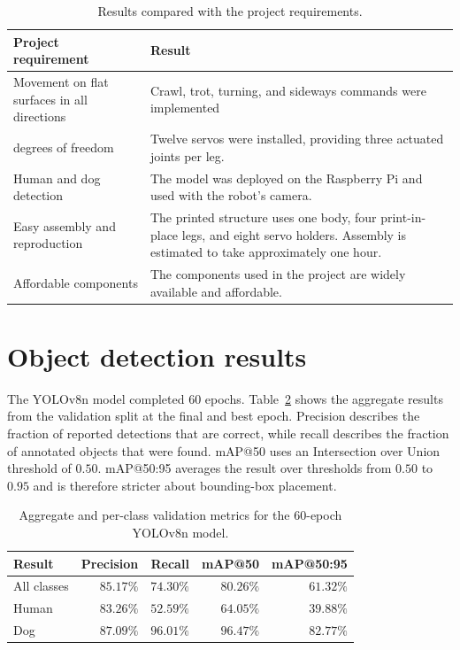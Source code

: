 \documentclass[a4paper,12pt]{report}
\begin{document}
\begin{table}[H]
\centering
\small
\begin{tabular}{
  >{\raggedright\arraybackslash}p{}
  >{\raggedright\arraybackslash}p{}
}
\hline
\textbf{Project requirement} & \textbf{Result} \\
\hline
Movement on flat surfaces in all directions & Crawl, trot, turning, and sideways commands were
implemented \\
12 degrees of freedom & Twelve servos were installed, providing three actuated joints per leg. \\
Human and dog detection & The model was deployed on the Raspberry Pi and used with the robot's
camera. \\
Easy assembly and reproduction & The printed structure uses one body, four print-in-place legs,
and eight servo holders. Assembly is estimated to take approximately one hour. \\
Affordable components & The components used in the project are widely available and affordable. \\
\hline
\end{tabular}
\caption{Results compared with the project requirements.}
\label{tab:project-requirement-results}
\end{table}

\section{Object detection results}
The YOLOv8n model completed 60 epochs. Table~\ref{tab:vision-validation-results} shows the aggregate
results from the validation split at the final and best epoch. Precision describes the fraction of
reported detections that are correct, while recall describes the fraction of annotated objects that
were found. mAP@50 uses an Intersection over Union threshold of $0.50$. mAP@50:95 averages the
result over thresholds from $0.50$ to $0.95$ and is therefore stricter about bounding-box
placement.

\begin{table}[H]
\centering
\begin{tabular}{lrrrr}
\hline
\textbf{Result} & \textbf{Precision} & \textbf{Recall} & \textbf{mAP@50} &
\textbf{mAP@50:95} \\
\hline
All classes & $85.17\%$ & $74.30\%$ & $80.26\%$ & $61.32\%$ \\
Human & $83.26\%$ & $52.59\%$ & $64.05\%$ & $39.88\%$ \\
Dog & $87.09\%$ & $96.01\%$ & $96.47\%$ & $82.77\%$ \\
\hline
\end{tabular}
\caption{Aggregate and per-class validation metrics for the 60-epoch YOLOv8n model.}
\label{tab:vision-validation-results}
\end{table}
\end{document}
